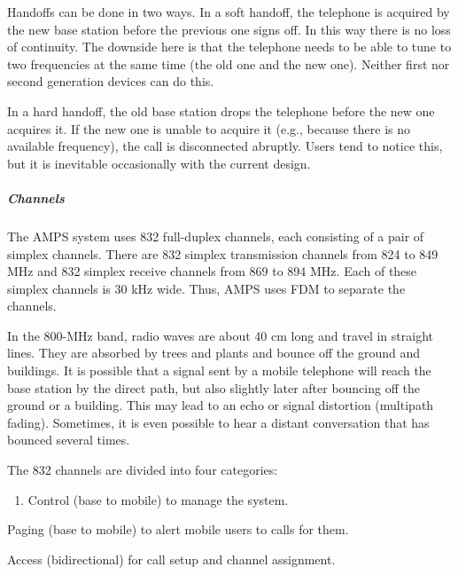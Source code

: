 \documentclass[b5paper,11pt]{memoir}
\begin{document}
Handoffs can be done in two ways. In a {soft handoff}, the telephone is
acquired by the new base station before the previous one signs off. In
this way there is no loss of continuity. The downside here is that the
telephone needs to be able to tune to two frequencies at the same time
(the old one and the new one). Neither first nor second generation
devices can do this.

In a {hard handoff}, the old base station drops the telephone before the
new one acquires it. If the new one is unable to acquire it (e.g.,
because there is no available frequency), the call is disconnected
abruptly. Users tend to notice this, but it is inevitable occasionally
with the current design.

\protect\hypertarget{0130661023_ch02lev1sec6.htmlux5cux23ch02lev3sec20}{}{}

\subparagraph{Channels}

The AMPS system uses 832 full-duplex channels, each consisting of a pair
of simplex channels. There are 832 simplex transmission channels from
824 to 849 MHz and 832 simplex receive channels from 869 to 894 MHz.
Each of these simplex channels is 30 kHz wide. Thus, AMPS uses FDM to
separate the channels.

In the 800-MHz band, radio waves are about 40 cm long and travel in
straight lines. They are absorbed by trees and plants and bounce off the
ground and buildings. It is possible that a signal sent by a mobile
telephone will reach the base station by the direct path, but also
slightly later after bouncing off the ground or a building. This may
lead to an echo or signal distortion (multipath fading). Sometimes, it
is even possible to hear a distant conversation that has bounced several
times.

The 832 channels are divided into four categories:

{}

\begin{enumerate}
\def\labelenumi{\arabic{enumi}.}
\item
  {}

  Control (base to mobile) to manage the system.
\end{enumerate}

{}

Paging (base to mobile) to alert mobile users to calls for them.

{}

Access (bidirectional) for call setup and channel assignment.

{}
\end{document}
